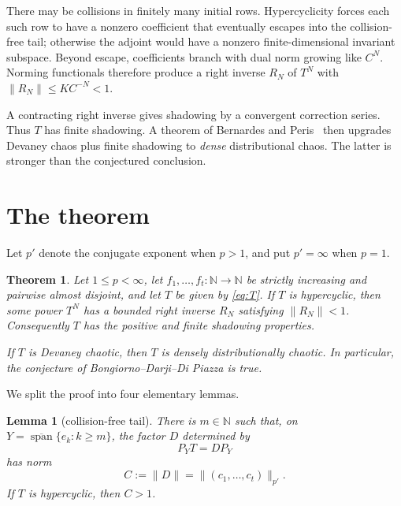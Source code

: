 \documentclass[11pt]{article}
\newtheorem{theorem}{Theorem}
\newtheorem{lemma}{Lemma}
\newcommand{\N}{\mathbb N}
\newcommand{\spn}{\operatorname{span}}
\begin{document}
There may be collisions in finitely many initial rows.  Hypercyclicity forces
each such row to have a nonzero coefficient that eventually escapes into the
collision-free tail; otherwise the adjoint would have a nonzero
finite-dimensional invariant subspace.  Beyond escape, coefficients branch
with dual norm growing like $C^N$.  Norming functionals therefore produce a
right inverse $R_N$ of $T^N$ with $\|R_N\|\le K C^{-N}<1$.

A contracting right inverse gives shadowing by a convergent correction
series.  Thus $T$ has finite shadowing.  A theorem of Bernardes and
Peris~\cite[Theorem~11]{BP} then upgrades Devaney chaos plus finite shadowing
to \emph{dense} distributional chaos.  The latter is stronger than the
conjectured conclusion.

\section{The theorem}
Let $p'$ denote the conjugate exponent when $p>1$, and put $p'=\infty$ when
$p=1$.

\begin{theorem}\label{thm:main}
Let $1\le p<\infty$, let $f_1,\ldots,f_t:\N\to\N$ be strictly increasing and
pairwise almost disjoint, and let $T$ be given by \eqref{eq:T}.
If $T$ is hypercyclic, then some power $T^N$ has a bounded right inverse
$R_N$ satisfying $\|R_N\|<1$.  Consequently $T$ has the positive and finite
shadowing properties.

If $T$ is Devaney chaotic, then $T$ is densely distributionally chaotic.  In
particular, the conjecture of Bongiorno--Darji--Di Piazza is true.
\end{theorem}

We split the proof into four elementary lemmas.

\begin{lemma}[collision-free tail]\label{lem:tail}
There is $m\in\N$ such that, on
$Y=\overline{\spn}\{e_k:k\ge m\}$, the factor $D$ determined by
\[
                P_YT=DP_Y
\]
has norm
\[
 C:=\|D\|=\|(c_1,\ldots,c_t)\|_{p'}.
\tag{2}\label{eq:C}
\]
If $T$ is hypercyclic, then $C>1$.
\end{lemma}
\end{document}
